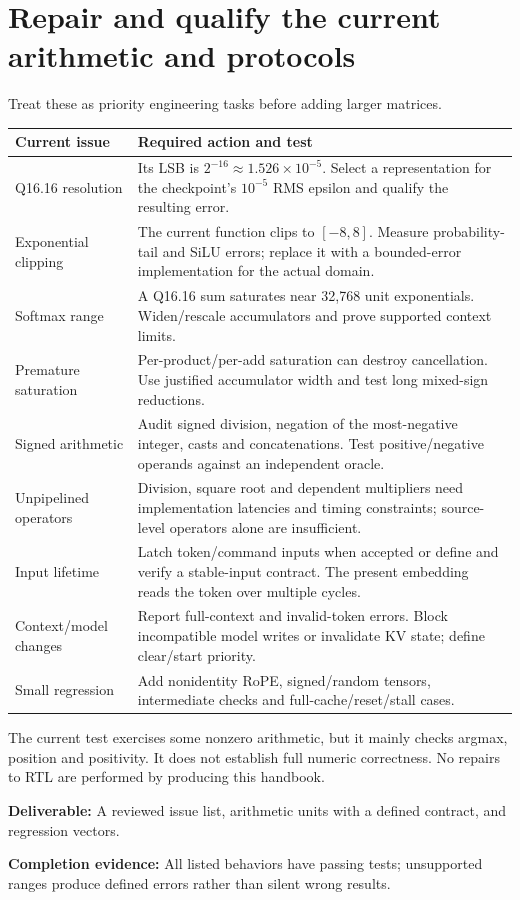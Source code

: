 \documentclass[11pt,a4paper]{article}
\newcommand{\phase}[2]{\clearpage\section{#1}\label{#2}}
\newcommand{\deliver}[2]{\begin{tcolorbox}[colback=pale,colframe=line,boxrule=0.5pt,arc=1mm,left=8pt,right=8pt,top=6pt,bottom=6pt]\textbf{Deliverable:} #1\par\textbf{Completion evidence:} #2\end{tcolorbox}}
\begin{document}
\phase{Repair and qualify the current arithmetic and protocols}{sec:repairs}
Treat these as priority engineering tasks before adding larger matrices.
\begin{tabularx}{\linewidth}{@{}p{38mm}Y@{}}
\toprule\textbf{Current issue} & \textbf{Required action and test}\\\midrule
Q16.16 resolution & Its LSB is $2^{-16}\approx1.526\times10^{-5}$. Select a representation for the checkpoint's $10^{-5}$ RMS epsilon and qualify the resulting error.\\
Exponential clipping & The current function clips to $[-8,8]$. Measure probability-tail and SiLU errors; replace it with a bounded-error implementation for the actual domain.\\
Softmax range & A Q16.16 sum saturates near 32,768 unit exponentials. Widen/rescale accumulators and prove supported context limits.\\
Premature saturation & Per-product/per-add saturation can destroy cancellation. Use justified accumulator width and test long mixed-sign reductions.\\
Signed arithmetic & Audit signed division, negation of the most-negative integer, casts and concatenations. Test positive/negative operands against an independent oracle.\\
Unpipelined operators & Division, square root and dependent multipliers need implementation latencies and timing constraints; source-level operators alone are insufficient.\\
Input lifetime & Latch token/command inputs when accepted or define and verify a stable-input contract. The present embedding reads the token over multiple cycles.\\
Context/model changes & Report full-context and invalid-token errors. Block incompatible model writes or invalidate KV state; define clear/start priority.\\
Small regression & Add nonidentity RoPE, signed/random tensors, intermediate checks and full-cache/reset/stall cases.\\\bottomrule
\end{tabularx}
The current test exercises some nonzero arithmetic, but it mainly checks argmax,
position and positivity. It does not establish full numeric correctness. No
repairs to RTL are performed by producing this handbook.
\deliver{A reviewed issue list, arithmetic units with a defined contract, and
regression vectors.}{All listed behaviors have passing tests; unsupported ranges
produce defined errors rather than silent wrong results.}
\end{document}
